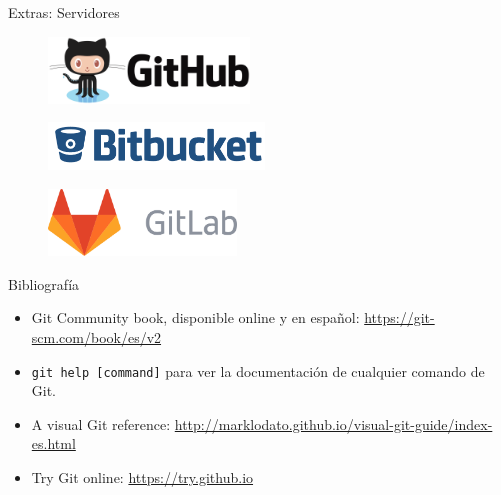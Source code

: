 \begin{frame}[t]{Extras: Servidores}

    \begin{figure}[ht]
        \begin{center}
            \includegraphics[height=0.7in]{images/github.png}
        \end{center}
    \end{figure}

    \begin{figure}[ht]
        \begin{center}
            \includegraphics[height=0.5in]{images/bitbucket.png}
        \end{center}
    \end{figure}

    \begin{figure}[ht]
        \begin{center}
            \includegraphics[height=0.7in]{images/gitlab.png}
        \end{center}
    \end{figure}

\end{frame}

\begin{frame}[t]{Bibliografía}

    \begin{itemize}
        \item Git Community book, disponible online y en español: \url{https://git-scm.com/book/es/v2}
        \item \texttt{git help [command]} para ver la documentación de cualquier comando de Git.
        \item A visual Git reference: \url{http://marklodato.github.io/visual-git-guide/index-es.html}
        \item Try Git online: \url{https://try.github.io}
    \end{itemize}

\end{frame}

